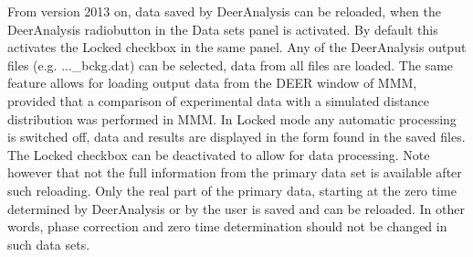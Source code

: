 \documentclass{article}
\begin{document}
From version 2013 on, data saved by DeerAnalysis can be reloaded, when the {\ttfamily DeerAnalysis} radiobutton in the {\ttfamily Data sets} panel is activated. By default this activates the {\ttfamily Locked} checkbox in the same panel. Any of the DeerAnalysis output files (e.g. {\ttfamily ...\_bckg.dat}) can be selected, data from all files are loaded. The same feature allows for loading output data from the DEER window of MMM, provided that a comparison of experimental data with a simulated distance distribution was performed in MMM. In {\ttfamily Locked} mode any automatic processing is switched off, data and results are displayed in the form found in the saved files. The {\ttfamily Locked} checkbox can be deactivated to allow for data processing. Note however that not the full information from the primary data set is available after such reloading. Only the real part of the primary data, starting at the zero time determined by DeerAnalysis or by the user is saved and can be reloaded. In other words, phase correction and zero time determination should not be changed in such data sets.
\end{document}
